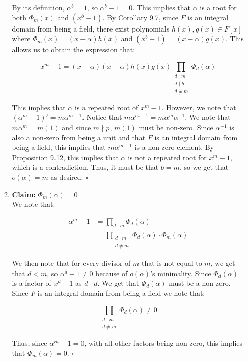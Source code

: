 \documentclass{article}
\begin{document}
\begin{enumerate}
\begin{enumerate}
    By its definition, $\alpha^b = 1$, so $\alpha^b - 1 = 0$. This implies that $\alpha$ is a root for both $\Phi_m(x)$ and $(x^b - 1)$. By Corollary 9.7, since $F$ is an integral domain from being a field, there exist polynomials $h(x), g(x) \in F[x]$ where $\Phi_m(x) = (x - \alpha)h(x)$ and $(x^b - 1) = (x - \alpha)g(x)$. This allows us to obtain the expression that:
    
    $$x^m - 1  = (x - \alpha)(x - \alpha)h(x)g(x)\prod_{\substack{d \mid m \\ d \nmid b \\ d \neq m}} \Phi_d(\alpha) $$

    This implies that $\alpha$ is a repeated root of $x^m - 1$. However, we note that $(\alpha^m - 1)' = m\alpha^{m-1}$. Notice that $m\alpha^{m-1} = m\alpha^{m}\alpha^{-1}$. We note that $m\alpha^m = m(1)$ and since $m \nmid p$, $m(1)$ must be non-zero. Since $\alpha^{-1}$ is also a non-zero from being a unit and that $F$ is an integral domain from being a field, this implies that $m\alpha^{m-1}$ is a non-zero element. By Proposition 9.12, this implies that $\alpha$ is not a repeated root for $x^m - 1$, which is a contradiction. Thus, it must be that $b = m$, so we get that $o(\alpha) = m$ as desired.  \hfill $\square$ \\ 

    \item 
    \textbf{Claim:} $\Phi_m(\alpha) = 0$\\

    We note that: 

    \begin{align*}
        \alpha^m - 1 &= \prod_{d \mid m} \Phi_d(\alpha) \\
        &= \prod_{\substack{d \mid m \\ d \neq m}} \Phi_d(\alpha) \cdot \Phi_m(\alpha)
    \end{align*}

    We then note that for every divisor of $m$ that is not equal to $m$, we get that $d < m$, so $\alpha^d - 1 \neq 0$ because of $o(\alpha)$'s minimality. Since $\Phi_d(\alpha)$ is a factor of $x^d - 1$ as $d \mid d$. We get that $\Phi_d(\alpha)$ must be a non-zero. Since $F$ is an integral domain from being a field we note that: 
    
    $$\prod_{\substack{d \mid m \\ d \neq m}} \Phi_d(\alpha) \neq 0$$

    Thus, since $\alpha^m - 1 = 0$, with all other factors being non-zero, this implies that $\Phi_m(\alpha) = 0$. \hfill $\square$ \\ 


\end{enumerate}
\end{enumerate}
\end{document}

